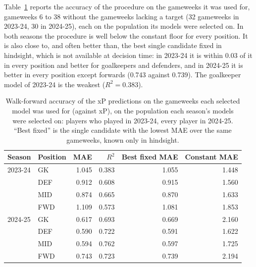 \documentclass[12pt,oneside,a4paper]{book}
\theoremstyle{definition}
\theoremstyle{remark}
\begin{document}
	Table~\ref{tab:predictor-mae} reports the accuracy of the procedure on the gameweeks it was
	used for, gameweeks 6 to 38 without the gameweeks lacking a target (32 gameweeks in 2023-24, 30
	in 2024-25), each on the population its models were selected on. In both seasons the procedure
	is well below the constant floor for every position. It is also close to, and often better
	than, the best single candidate fixed in hindsight, which is not available at decision time:
	in 2023-24 it is within 0.03 of it in every position and better for goalkeepers and defenders,
	and in 2024-25 it is better in every position except forwards (0.743 against 0.739). The
	goalkeeper model of 2023-24 is the weakest ($R^2=0.383$).

	\begin{table}[ht]
		\centering
		\caption{Walk-forward accuracy of the xP predictions on the gameweeks each selected model was
			used for (against xP), on the population each season's models were selected on: players who
			played in 2023-24, every player in 2024-25. ``Best fixed'' is the single candidate with the
			lowest MAE over the same gameweeks, known only in hindsight.}
		\label{tab:predictor-mae}
		\begin{tabular}{llrrrr}
			\toprule
			Season & Position & MAE & $R^2$ & Best fixed MAE & Constant MAE \\
			\midrule
			2023-24 & GK  & 1.045 & 0.383 & 1.055 & 1.448 \\
			& DEF & 0.912 & 0.608 & 0.915 & 1.560 \\
			& MID & 0.874 & 0.665 & 0.870 & 1.633 \\
			& FWD & 1.109 & 0.573 & 1.081 & 1.853 \\
			\midrule
			2024-25 & GK  & 0.617 & 0.693 & 0.669 & 2.160 \\
			& DEF & 0.590 & 0.722 & 0.591 & 1.622 \\
			& MID & 0.594 & 0.762 & 0.597 & 1.725 \\
			& FWD & 0.743 & 0.723 & 0.739 & 2.194 \\
			\bottomrule
		\end{tabular}
	\end{table}
\end{document}
